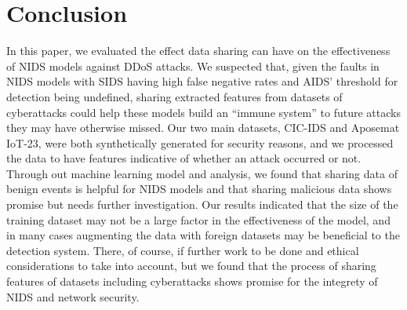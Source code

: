 \section{Conclusion}
\label{sec:conclusion}

In this paper, we evaluated the effect data sharing can have on the effectiveness of NIDS models against DDoS attacks. We suspected that, given the faults in NIDS models with SIDS having high false negative rates and AIDS’ threshold for detection being undefined, sharing extracted features from datasets of cyberattacks could help these models build an “immune system” to future attacks they may have otherwise missed. Our two main datasets, CIC-IDS and Aposemat IoT-23, were both synthetically generated for security reasons, and we processed the data to have features indicative of whether an attack occurred or not. Through out machine learning model and analysis, we found that sharing data of benign events is helpful for NIDS models and that sharing malicious data shows promise but needs further investigation. Our results indicated that the size of the training dataset may not be a large factor in the effectiveness of the model, and in many cases augmenting the data with foreign datasets may be beneficial to the detection system. There, of course, if further work to be done and ethical considerations to take into account, but we found that the process of sharing features of datasets including cyberattacks shows promise for the integrety of NIDS and network security. 
